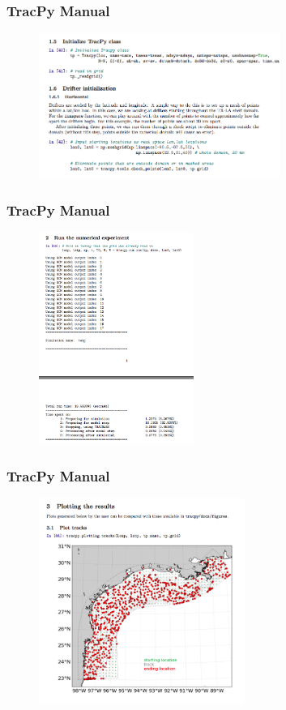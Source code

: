 \documentclass[ignorenonframetext]{beamer}
\begin{document}
\begin{frame}[t,noframenumbering]\frametitle{TracPy Manual}
	\begin{figure}[htbp]
		\centering
		\includegraphics[width=0.7\textwidth]{figures/manual4}
	\end{figure}
\end{frame}
\begin{frame}[t,noframenumbering]\frametitle{TracPy Manual}
	\begin{figure}[htbp]
		\centering
		\includegraphics[width=0.45\textwidth]{figures/manual5}
	\end{figure}
\end{frame}
\begin{frame}[t,noframenumbering]\frametitle{TracPy Manual}
	\begin{figure}[htbp]
		\centering
		\includegraphics[width=0.6\textwidth]{figures/manual6}
	\end{figure}
\end{frame}
\end{document}
